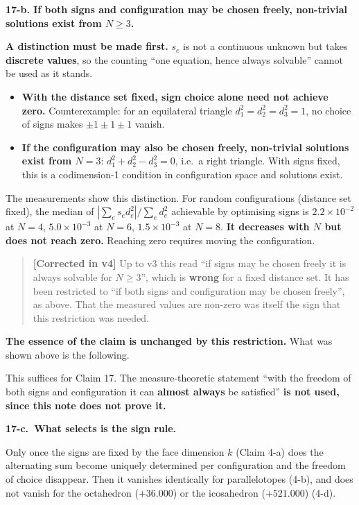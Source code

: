 \documentclass[
  10pt,
]{article}
\providecommand{\tightlist}{%
  \setlength{\itemsep}{0pt}\setlength{\parskip}{0pt}}
\begin{document}
\textbf{17-b. If both signs and configuration may be chosen freely,
non-trivial solutions exist from \(N\ge3\).}

\textbf{A distinction must be made first.} \(s_e\) is not a continuous
unknown but takes \textbf{discrete values}, so the counting ``one
equation, hence always solvable'' cannot be used as it stands.

\begin{itemize}
\tightlist
\item
  \textbf{With the distance set fixed, sign choice alone need not
  achieve zero.} Counterexample: for an equilateral triangle
  \(d_1^2=d_2^2=d_3^2=1\), no choice of signs makes \(\pm1\pm1\pm1\)
  vanish.
\item
  \textbf{If the configuration may also be chosen freely, non-trivial
  solutions exist from \(N=3\)}: \(d_1^2+d_2^2-d_3^2=0\), i.e.~a right
  triangle. With signs fixed, this is a codimension-1 condition in
  configuration space and solutions exist.
\end{itemize}

The measurements show this distinction. For random configurations
(distance set fixed), the median of \(|\sum_e s_ed_e^2|/\sum_e d_e^2\)
achievable by optimising signs is \(2.2\times10^{-2}\) at \(N=4\),
\(5.0\times10^{-3}\) at \(N=6\), \(1.5\times10^{-3}\) at \(N=8\).
\textbf{It decreases with \(N\) but does not reach zero.} Reaching zero
requires moving the configuration.

\begin{quote}
\textbf{{[}Corrected in v4{]}} Up to v3 this read ``if signs may be
chosen freely it is always solvable for \(N\ge3\)'', which is
\textbf{wrong} for a fixed distance set. It has been restricted to ``if
both signs and configuration may be chosen freely'', as above. That the
measured values are non-zero was itself the sign that this restriction
was needed.
\end{quote}

\textbf{The essence of the claim is unchanged by this restriction.} What
was shown above is the following.

This suffices for Claim 17. The measure-theoretic statement ``with the
freedom of both signs and configuration it can \textbf{almost always} be
satisfied'' \textbf{is not used, since this note does not prove it.}

\textbf{17-c.~What selects is the sign rule.}

Only once the signs are fixed by the face dimension \(k\) (Claim 4-a)
does the alternating sum become uniquely determined per configuration
and the freedom of choice disappear. Then it vanishes identically for
parallelotopes (4-b), and does not vanish for the octahedron
(\(+36.000\)) or the icosahedron (\(+521.000\)) (4-d).
\end{document}

